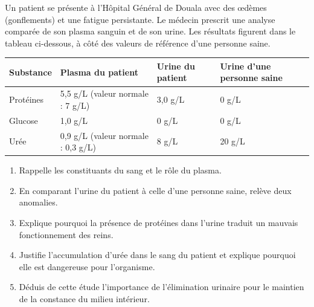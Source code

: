 \documentclass[11pt]{article}
\begin{document}
\begin{exercice}
Un patient se présente à l'Hôpital Général de Douala avec des \oe dèmes (gonflements) et une fatigue persistante. Le médecin prescrit une analyse comparée de son plasma sanguin et de son urine. Les résultats figurent dans le tableau ci-dessous, à côté des valeurs de référence d'une personne saine.
\begin{center}
\begin{tabularx}{\linewidth}{|l|X|X|X|}
\hline
\rowcolor{popblueL} \textbf{Substance} & \textbf{Plasma du patient} & \textbf{Urine du patient} & \textbf{Urine d'une personne saine} \\
\hline
Protéines & 5,5 g/L (valeur normale : 7 g/L) & 3,0 g/L & 0 g/L \\
\hline
Glucose & 1,0 g/L & 0 g/L & 0 g/L \\
\hline
Urée & 0,9 g/L (valeur normale : 0,3 g/L) & 8 g/L & 20 g/L \\
\hline
\end{tabularx}
\end{center}
\begin{enumerate}
\item Rappelle les constituants du sang et le rôle du plasma.
\item En comparant l'urine du patient à celle d'une personne saine, relève deux anomalies.
\item Explique pourquoi la présence de protéines dans l'urine traduit un mauvais fonctionnement des reins.
\item Justifie l'accumulation d'urée dans le sang du patient et explique pourquoi elle est dangereuse pour l'organisme.
\item Déduis de cette étude l'importance de l'élimination urinaire pour le maintien de la constance du milieu intérieur.
\end{enumerate}
\end{exercice}
\end{document}
